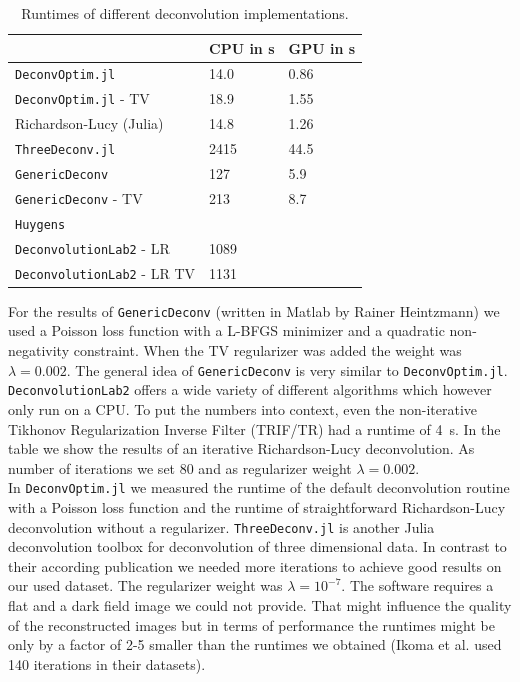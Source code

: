 \documentclass{juliacon}
\begin{document}
        \begin{table}[h]
            \begin{tabular}{l l l}
                &  CPU in s& GPU in s\\ 
            \hline
            \verb|DeconvOptim.jl| & 14.0 & 0.86\\
            \verb|DeconvOptim.jl| - TV & 18.9 & 1.55 \\
            Richardson-Lucy (Julia) & 14.8 & 1.26 \\
            \verb|ThreeDeconv.jl|& 2415 & 44.5 \\
            \verb|GenericDeconv|  & 127 & 5.9\\
            \verb|GenericDeconv| - TV & 213 & 8.7 \\
            \verb|Huygens|  & & \\
            \verb|DeconvolutionLab2| - LR & 1089 & \\
            \verb|DeconvolutionLab2| - LR TV& 1131 & 
            \end{tabular}
            \caption{Runtimes of different deconvolution implementations.}
            \label{tab:deconv}
        \end{table}


        For the results of \verb|GenericDeconv| (written in Matlab by Rainer Heintzmann) we used a Poisson loss function with a L-BFGS minimizer and a quadratic non-negativity constraint.
        When the TV regularizer was added the weight was $\lambda = 0.002$.
        The general idea of \verb|GenericDeconv| is very similar to \verb|DeconvOptim.jl|.
        \verb|DeconvolutionLab2| offers a wide variety of different algorithms which however only run on a CPU. To put the numbers into context, even the non-iterative Tikhonov Regularization Inverse Filter (TRIF/TR) had a runtime of \SI{4}{\second}. In the table we show the results of an 
        iterative Richardson-Lucy deconvolution. As number of iterations we set 80 and as regularizer weight $\lambda=0.002$.\\
        In \verb|DeconvOptim.jl| we measured the runtime of the default deconvolution routine with a Poisson loss function
        and the runtime of straightforward Richardson-Lucy deconvolution without a regularizer.
        \verb|ThreeDeconv.jl| is another Julia deconvolution toolbox for deconvolution of three dimensional data.
        In contrast to their according publication \cite{ikoma2018convex} we needed more iterations to achieve good results
        on our used dataset. The regularizer weight was $\lambda=10^{-7}$. 
        The software requires a flat and a dark field image we could not provide. That might influence the quality of the reconstructed images
        but in terms of performance the runtimes might be only by a factor of 2-5 smaller than the runtimes we obtained (Ikoma et al. used 140 iterations in their datasets).
\end{document}
